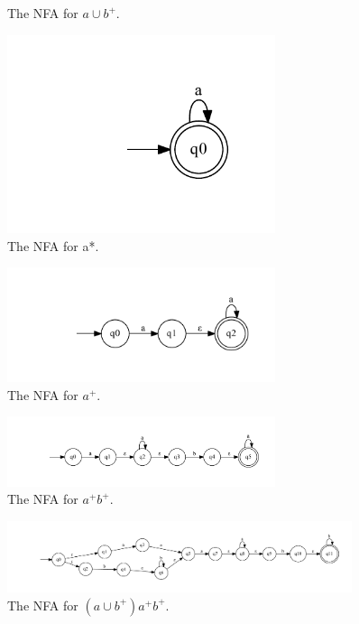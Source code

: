 \documentclass[10pt] {article}
\begin{document}
\begin{enumerate}
\begin{figure}[H]
\caption{The NFA for $a \cup b^{+}$.}
\label{49}
\end{figure}
\begin{figure}[H]
\includegraphics[width=0.7\textwidth]{bc28.pdf}
\caption{The NFA for a*.}
\label{50}
\end{figure}
\begin{figure}[H]
\includegraphics[width=0.7\textwidth]{cd28.pdf}
\caption{The NFA for $a^{+}$.}
\label{51}
\end{figure}
\begin{figure}[H]
\includegraphics[width=0.7\textwidth]{ce28.pdf}
\caption{The NFA for $a^{+}b^{+}$.}
\label{52}
\end{figure}
\begin{figure}[H]
\includegraphics[width=0.9\textwidth]{cf28.pdf}
\caption{The NFA for $(a \cup b^{+})a^{+}b^{+}$.}
\label{53}
\end{figure}
\end{enumerate}
\end{document}
